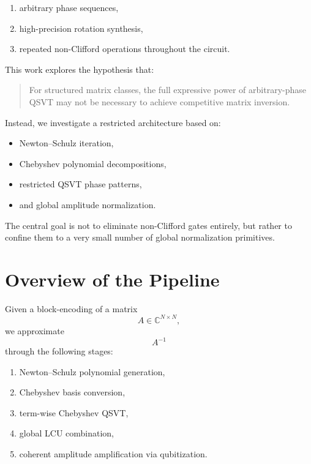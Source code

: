 \documentclass[12pt,a4paper]{article}
\begin{document}
\begin{enumerate}
    \item arbitrary phase sequences,
    \item high-precision rotation synthesis,
    \item repeated non-Clifford operations throughout the circuit.
\end{enumerate}

This work explores the hypothesis that:

\begin{quote}
For structured matrix classes, the full expressive power of arbitrary-phase QSVT may not be necessary to achieve competitive matrix inversion.
\end{quote}

Instead, we investigate a restricted architecture based on:

\begin{itemize}
    \item Newton--Schulz iteration,
    \item Chebyshev polynomial decompositions,
    \item restricted QSVT phase patterns,
    \item and global amplitude normalization.
\end{itemize}

The central goal is not to eliminate non-Clifford gates entirely, but rather to confine them to a very small number of global normalization primitives.


\section{Overview of the Pipeline}

Given a block-encoding of a matrix
\[
A \in \mathbb{C}^{N\times N},
\]
we approximate
\[
A^{-1}
\]
through the following stages:

\begin{enumerate}
    \item Newton--Schulz polynomial generation,
    \item Chebyshev basis conversion,
    \item term-wise Chebyshev QSVT,
    \item global LCU combination,
    \item coherent amplitude amplification via qubitization.
\end{enumerate}
\end{document}
